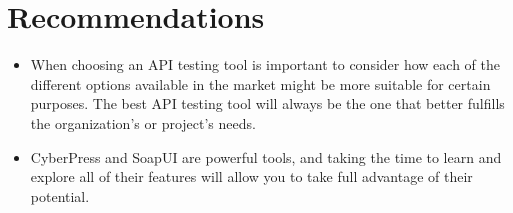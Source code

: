 \documentclass{article}
\begin{document}
	\section{Recommendations}
	\begin{itemize}
		\item When choosing an API testing tool is important to consider how each of the different options available in the market might be more suitable for certain purposes. The best API testing tool will always be the one that better fulfills the organization's or project's needs.
		\item CyberPress and SoapUI are powerful tools, and taking the time to learn and explore all of their features will allow you to take full advantage of their potential.
	\end{itemize}
	
\end{document}
